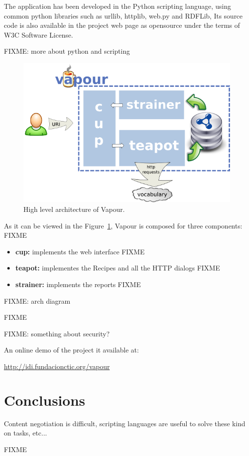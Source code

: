 The application has been developed in the Python scripting language, using common
python libraries such as urllib, httplib, web.py and RDFLib, Its source code is 
also available in the project web page as opensource under the terms of W3C Software 
License.

FIXME: more about python and scripting

\begin{figure}
 \centering
 \includegraphics[width=12cm]{images/arch.png}
 \caption{\label{fig:arch}High level architecture of Vapour.}
\end{figure}

As it can be viewed in the Figure~\ref{fig:arch}, Vapour is composed for three 
components: FIXME

\begin{itemize}

  \item \textbf{cup:} implements the web interface FIXME

  \item \textbf{teapot:} implementes the Recipes and all the HTTP dialogs FIXME

  \item \textbf{strainer:} implements the reports FIXME

\end{itemize}

FIXME: arch diagram

FIXME

FIXME: something about security?

An online demo of the project it available at: 
\begin{center}\url{http://idi.fundacionctic.org/vapour}\end{center}

\section{Conclusions}

Content negotiation is difficult, scripting languages are useful to solve these kind on tasks, etc...

FIXME


